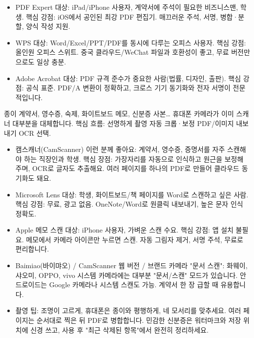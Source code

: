 
\begin{itemize}
  \item PDF Expert 대상: iPad/iPhone 사용자, 계약서에 주석이 필요한 비즈니스맨, 학생. 핵심 강점: iOS에서 공인된 최강 PDF 편집기. 매끄러운 주석, 서명, 병합·분할, 양식 작성 지원.
  \item WPS 대상: Word/Excel/PPT/PDF를 동시에 다루는 오피스 사용자. 핵심 강점: 올인원 오피스 스위트. 중국 클라우드/WeChat 파일과 호환성이 좋고, 무료 버전만으로도 일상 충분.
  \item Adobe Acrobat 대상: PDF 규격 준수가 중요한 사람(법률, 디자인, 출판). 핵심 강점: 공식 표준. PDF/A 변환이 정확하고, 크로스 기기 동기화와 전자 서명이 전문적입니다.
\end{itemize}


종이 계약서, 영수증, 숙제, 화이트보드 메모, 신분증 사본… 휴대폰 카메라가 이미 스캐너 대부분을 대체합니다. 핵심 흐름: 선명하게 촬영 자동 크롭·보정 PDF/이미지 내보내기 OCR 선택.

\begin{itemize}
  \item 캠스캐너(CamScanner) 이런 분께 좋아요: 계약서, 영수증, 증명서를 자주 스캔해야 하는 직장인과 학생. 핵심 장점: 가장자리를 자동으로 인식하고 원근을 보정해 주며, OCR로 글자도 추출해요. 여러 페이지를 하나의 PDF로 만들어 클라우드 동기화도 돼요.
  \item Microsoft Lens 대상: 학생, 화이트보드/책 페이지를 Word로 스캔하고 싶은 사람. 핵심 강점: 무료, 광고 없음. OneNote/Word로 원클릭 내보내기, 높은 문자 인식 정확도.
  \item Apple 메모 스캔 대상: iPhone 사용자, 가벼운 스캔 수요. 핵심 강점: 앱 설치 불필요. 메모에서 카메라 아이콘만 누르면 스캔. 자동 그림자 제거, 서명 주석, 무료로 편리합니다.
  \item Baimiao(바이먀오) / CamScanner 웹 버전 / 브랜드 카메라 "문서 스캔": 화웨이, 샤오미, OPPO, vivo 시스템 카메라에는 대부분 "문서/스캔" 모드가 있습니다. 안드로이드는 Google 카메라나 시스템 스캔도 가능. 계약서 한 장 급할 때 유용합니다.
  \item 촬영 팁: 조명이 고르게, 휴대폰은 종이와 평행하게, 네 모서리를 맞추세요. 여러 페이지는 순서대로 찍은 뒤 PDF로 병합합니다. 민감한 신분증은 워터마크와 저장 위치에 신경 쓰고, 사용 후 "최근 삭제된 항목"에서 완전히 정리하세요.
\end{itemize}


